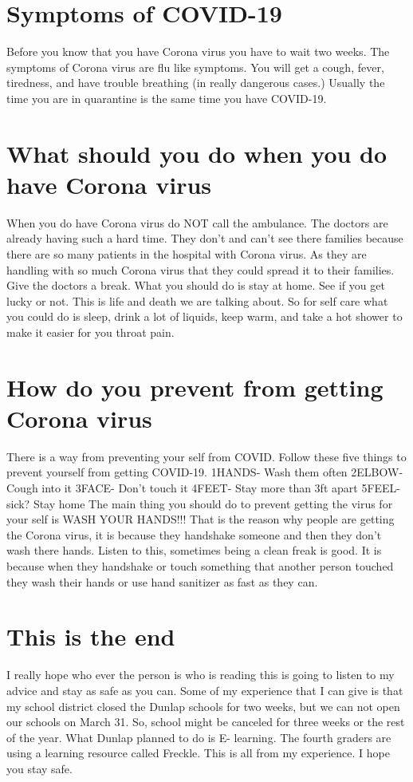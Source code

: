 \documentclass{article}
\begin{document}
\section{Symptoms of COVID-19}

Before you know that you have Corona virus you have to wait two weeks. The symptoms of Corona virus are flu like symptoms. You will get a cough, fever, tiredness, and have trouble breathing (in really dangerous cases.) Usually the time you are in quarantine is the same time you have COVID-19. 


\section{What should you do when you do have Corona virus}
    When you do have Corona virus do NOT call the ambulance. The doctors are already having such a hard time. They don't and can't see there families because there are so many patients in the hospital with Corona virus. As they are handling with so much Corona virus that they could spread it to their families. Give the doctors a break. What you should do is stay at home. See if you get lucky or not. This is life and death we are talking about. So for self care what you could do is sleep, drink a lot of liquids, keep warm, and take a hot shower to make it easier for you throat pain. 


\section{ How do you prevent from getting Corona virus}

    There is a way from preventing your self from COVID. Follow these five things to prevent yourself from getting COVID-19.
  1HANDS- Wash them often
  2ELBOW- Cough into it
  3FACE-  Don't touch it
  4FEET-  Stay more than 3ft apart     
  5FEEL-  sick? Stay home
 The main thing you should do to prevent getting the virus for your self is WASH YOUR HANDS!!! That is the reason why people are getting the Corona virus, it is because they handshake someone and then they don't wash there hands. Listen to this, sometimes being a clean freak is good. It is because when they handshake or touch something that another person touched they wash their hands or use hand sanitizer as fast as they can. 
 
 
 \section{ This is the end}
 
    I really hope who ever the person is who is reading this is going to  listen to my advice and stay as safe as you can. Some of my experience that I can give is that my school district closed the Dunlap schools for two weeks, but we can not open our schools on March 31. So, school might be canceled for three weeks or the rest of the year. What Dunlap planned to do is E- learning. The fourth graders are using a learning resource called Freckle. This is all from my experience. I hope you stay safe.
    
\end{document}
